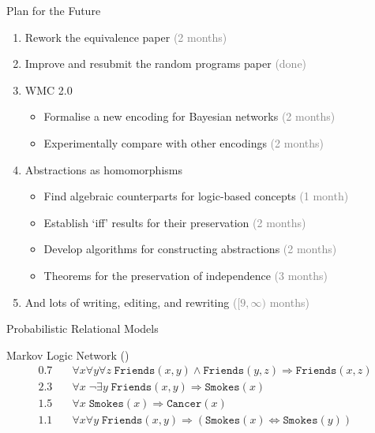 \documentclass{beamer}
\begin{document}
\begin{frame}{Plan for the Future}
  \begin{enumerate}
  \item Rework the equivalence paper \textcolor{gray}{(2 months)}
  \item Improve and resubmit the random programs paper \textcolor{gray}{(done)}
  \item WMC 2.0
    \begin{itemize}
    \item Formalise a new encoding for Bayesian networks \textcolor{gray}{(2 months)}
    \item Experimentally compare with other encodings \textcolor{gray}{(2 months)}
    \end{itemize}
  \item Abstractions as homomorphisms
    \begin{itemize}
    \item Find algebraic counterparts for logic-based concepts \textcolor{gray}{(1 month)}
    \item Establish `iff' results for their preservation \textcolor{gray}{(2 months)}
    \item Develop algorithms for constructing abstractions \textcolor{gray}{(2 months)}
    \item Theorems for the preservation of independence \textcolor{gray}{(3 months)}
    \end{itemize}
  \item And lots of writing, editing, and rewriting \textcolor{gray}{($[9, \infty)$ months)}
  \end{enumerate}
\end{frame}

\appendix

\begin{frame}
\end{frame}

\begin{frame}{Probabilistic Relational Models}
  \begin{block}{Markov Logic Network (\cite{DBLP:journals/ml/RichardsonD06})}
    \vspace*{-\baselineskip}\setlength\belowdisplayshortskip{0pt}
    \begin{align*}
      0.7 &\quad \forall x \forall y \forall z \; \mathtt{Friends}(x, y) \land \mathtt{Friends}(y, z) \Rightarrow \mathtt{Friends}(x, z) \\
      2.3 &\quad \forall x \; \lnot\exists y \; \mathtt{Friends}(x, y) \Rightarrow \mathtt{Smokes}(x) \\
      1.5 &\quad \forall x \; \mathtt{Smokes}(x) \Rightarrow \mathtt{Cancer}(x) \\
      1.1 &\quad \forall x \forall y \; \mathtt{Friends}(x, y) \Rightarrow (\mathtt{Smokes}(x) \Leftrightarrow \mathtt{Smokes}(y))
    \end{align*}
  \end{block}
\end{frame}
\end{document}
